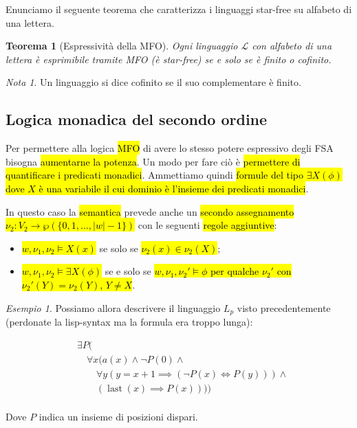 \documentclass[a4paper,11pt,twoside]{article}
\theoremstyle{plain}
\newtheorem{thm}{Teorema}[section]
\theoremstyle{definition}
\theoremstyle{remark}
\newtheorem{esempio}{Esempio}[section]
\newtheorem*{nota}{Nota}
\DeclareMathOperator{\last}{last}
\begin{document}
Enunciamo il seguente teorema che caratterizza i linguaggi star-free su alfabeto
di una lettera.

\begin{thm}[Espressività della MFO]
  Ogni linguaggio $\mathcal{L}$ con alfabeto di una lettera è esprimibile
  tramite MFO (è star-free) se e solo se è finito o cofinito.
\end{thm}

\begin{nota}
  Un linguaggio si dice cofinito se il suo complementare è finito.
\end{nota}

\subsection{Logica monadica del secondo ordine}\label{sec:mso}

Per permettere alla logica \hl{MFO} di avere lo stesso potere espressivo degli
FSA bisogna \hl{aumentarne la potenza}. Un modo per fare ciò è \hl{permettere di
quantificare i predicati monadici}. Ammettiamo quindi \hl{formule del tipo
$\exists X(\phi)$ dove $X$ è una variabile il cui dominio è l'insieme dei
predicati monadici}.

In questo caso la \hl{semantica} prevede anche un \hl{secondo assegnamento}
\hl{$\nu_2: V_2 \to \wp(\{0,1,\ldots,|w|-1\})$} con le seguenti \hl{regole
aggiuntive}:

\begin{itemize}
  \item \hl{$w, \nu_1, \nu_2 \models X(x)$} se solo se
    \hl{$\nu_2(x) \in \nu_2(X)$};
  \item \hl{$w, \nu_1, \nu_2 \models \exists X(\phi)$} se e solo se
    \hl{$w, \nu_1, \nu_2' \models \phi$ per qualche $\nu_2'$ con
    $\nu_2'(Y) = \nu_2(Y)$, $Y \neq X$}.
\end{itemize}

\begin{esempio}
  Possiamo allora descrivere il linguaggio $L_p$ visto precedentemente
  (perdonate la lisp-syntax ma la formula era troppo lunga):

  \begin{align*}
    & \exists P( \\
    &   \quad \forall x(a(x) \land \neg P(0) \land \\
    &   \quad \quad \forall y (y = x+1 \implies (\neg P(x) \iff P(y))) \land \\
    &   \quad \quad (\last(x) \implies P(x)))) \\
  \end{align*}

  Dove $P$ indica un insieme di posizioni dispari.
\end{esempio}
\end{document}
